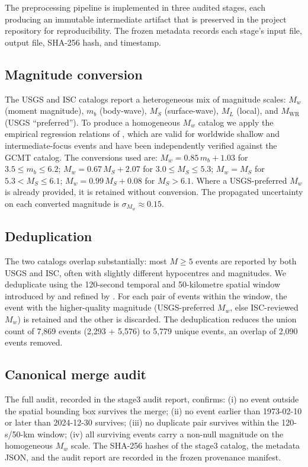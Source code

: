 \documentclass[10pt,a4paper,twocolumn]{article}
\begin{document}
The preprocessing pipeline is implemented in three audited stages, each producing an immutable intermediate artifact that is preserved in the project repository for reproducibility. The frozen metadata records each stage's input file, output file, SHA-256 hash, and timestamp.

\subsection{Magnitude conversion}

The USGS and ISC catalogs report a heterogeneous mix of magnitude scales: $M_w$ (moment magnitude), $m_b$ (body-wave), $M_S$ (surface-wave), $M_L$ (local), and $M_{\text{WR}}$ (USGS ``preferred''). To produce a homogeneous $M_w$ catalog we apply the empirical regression relations of \cite{scordilis2006}, which are valid for worldwide shallow and intermediate-focus events and have been independently verified against the GCMT catalog. The conversions used are: $M_w = 0.85\,m_b + 1.03$ for $3.5 \leq m_b \leq 6.2$; $M_w = 0.67\,M_S + 2.07$ for $3.0 \leq M_S \leq 5.3$; $M_w = M_S$ for $5.3 < M_S \leq 6.1$; $M_w = 0.99\,M_S + 0.08$ for $M_S > 6.1$. Where a USGS-preferred $M_w$ is already provided, it is retained without conversion. The propagated uncertainty on each converted magnitude is $\sigma_{M_w}\approx0.15$.

\subsection{Deduplication}

The two catalogs overlap substantially: most $M\geq5$ events are reported by both USGS and ISC, often with slightly different hypocentres and magnitudes. We deduplicate using the 120-second temporal and 50-kilometre spatial window introduced by \cite{gardner1974} and refined by \cite{reasenberg1985}. For each pair of events within the window, the event with the higher-quality magnitude (USGS-preferred $M_w$, else ISC-reviewed $M_w$) is retained and the other is discarded. The deduplication reduces the union count of 7{,}869 events (2{,}293 + 5{,}576) to 5{,}779 unique events, an overlap of 2{,}090 events removed.

\subsection{Canonical merge audit}

The full audit, recorded in the stage3 audit report, confirms: (i) no event outside the spatial bounding box survives the merge; (ii) no event earlier than 1973-02-10 or later than 2024-12-30 survives; (iii) no duplicate pair survives within the 120-s/50-km window; (iv) all surviving events carry a non-null magnitude on the homogeneous $M_w$ scale. The SHA-256 hashes of the stage3 catalog, the metadata JSON, and the audit report are recorded in the frozen provenance manifest.
\end{document}
